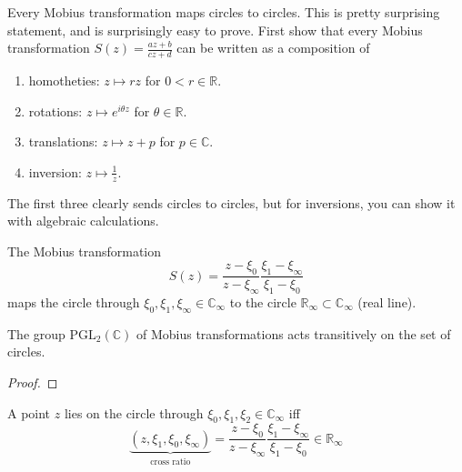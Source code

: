   \begin{exercise}
    Every Mobius transformation maps circles to circles. This is pretty surprising statement, and is surprisingly easy to prove. First show that every Mobius transformation $S(z) = \frac{az + b}{cz + d}$ can be written as a composition of 
    \begin{enumerate}
      \item homotheties: $z \mapsto rz$ for $0 < r \in \mathbb{R}$. 
      \item rotations: $z \mapsto e^{i \theta z}$ for $\theta \in \mathbb{R}$. 
      \item translations: $z \mapsto z + p$ for $p \in \mathbb{C}$. 
      \item inversion: $z \mapsto \frac{1}{z}$. 
    \end{enumerate}
    The first three clearly sends circles to circles, but for inversions, you can show it with algebraic calculations. 
  \end{exercise}

  \begin{corollary}
    \label{thm:mobius-transformation-through-three-points}
    The Mobius transformation 
    \begin{equation}
      S(z) = \frac{z - \xi_0}{z - \xi_\infty} \frac{\xi_1 - \xi_\infty}{\xi_1 - \xi_0} 
    \end{equation}
    maps the circle through $\xi_0, \xi_1, \xi_\infty \in \mathbb{C}_\infty$ to the circle $\mathbb{R}_\infty \subset \mathbb{C}_\infty$ (real line). 
  \end{corollary}

  \begin{corollary}
    \label{thm:transitivity-on-triples-of-points}
    The group $\mathrm{PGL}_2 (\mathbb{C})$ of Mobius transformations acts transitively on the set of circles. 
  \end{corollary}
  \begin{proof}

  \end{proof}

  \begin{corollary}
    \label{thm:cross-ratio-criterion-for-concyclicity}
    A point $z$ lies on the circle through $\xi_0, \xi_1, \xi_2 \in \mathbb{C}_\infty$ iff 
    \begin{equation}
      \underbrace{(z, \xi_1, \xi_0, \xi_{\infty})}_{\text{cross ratio}} = \frac{z - \xi_0}{z - \xi_\infty} \frac{\xi_1 - \xi_\infty}{\xi_1 - \xi_0} \in \mathbb{R}_\infty
    \end{equation}
  \end{corollary}

